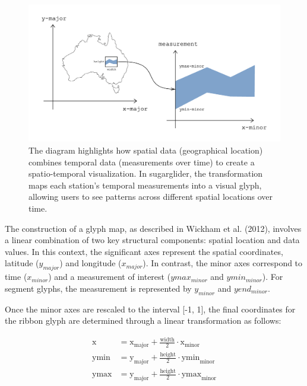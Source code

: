 \begin{figure}

{\centering \includegraphics[width=0.9\linewidth]{figures/diagram-transformation} 

}

\caption{The diagram highlights how spatial data (geographical location) combines temporal data (measurements over time) to create a spatio-temporal visualization. In sugarglider, the transformation maps each station's temporal measurements into a visual glyph, allowing users to see patterns across different spatial locations over time.}\label{fig:unnamed-chunk-7}
\end{figure}

The construction of a glyph map, as described in Wickham et al. (2012), involves a linear combination of two key structural components: spatial location and data values. In this context, the significant axes represent the spatial coordinates, latitude (\(y_{major}\)) and longitude (\(x_{major}\)). In contrast, the minor axes correspond to time (\(x_{minor}\)) and a measurement of interest (\(ymax_{minor}\) and \(ymin_{minor}\)). For segment glyphs, the measurement is represented by \(y_{minor}\) and \(yend_{minor}\).

Once the minor axes are rescaled to the interval {[}-1, 1{]}, the final coordinates for the ribbon glyph are determined through a linear transformation as follows:

\begin{align}
\text{x} &= \text{x}_{\text{major}} + \frac{\text{width}}{2} \cdot \text{x}_{\text{minor}} \\
\text{ymin} &= \text{y}_{\text{major}} + \frac{\text{height}}{2} \cdot \text{ymin}_{\text{minor}} \\
\text{ymax} &= \text{y}_{\text{major}} + \frac{\text{height}}{2} \cdot \text{ymax}_{\text{minor}}
\end{align}


